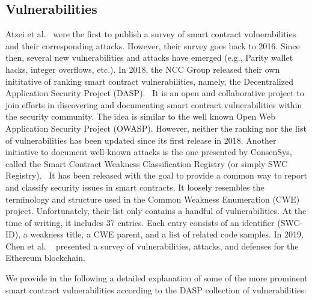     \subsection{Vulnerabilities}
        Atzei et al.~\cite{atzei2017survey} were the first to publish a survey of smart contract vulnerabilities and their corresponding attacks.
        However, their survey goes back to 2016.
        Since then, several new vulnerabilities and attacks have emerged (e.g., Parity wallet hacks, integer overflows, etc.).
        In 2018, the NCC Group released their own inititative of ranking smart contract vulnerabilities, namely, the Decentralized Application Security Project (DASP).~\cite{dasp}
        It is an open and collaborative project to join efforts in discovering and documenting smart contract vulnerabilities within the security community.
        The idea is similar to the well known Open Web Application Security Project (OWASP).
        However, neither the ranking nor the list of vulnerabilities has been updated since its first release in 2018.
        Another initiative to document well-known attacks is the one presented by ConsenSys, called the Smart Contract Weakness Classification Registry (or simply SWC Registry).~\cite{swcregistry}
        It has been released with the goal to provide a common way to report and classify security issues in smart contracts.
        It loosely resembles the terminology and structure used in the Common Weakness Enumeration (CWE) project.
        Unfortunately, their list only contains a handful of vulnerabilities.
        At the time of writing, it includes 37 entries.
        Each entry consists of an identifier (SWC-ID), a weakness title, a CWE parent, and a list of related code samples.
        In 2019, Chen et al. ~\cite{chen2020survey} presented a survey of vulnerabilities, attacks, and defenses for the Ethereum blockchain.

        We provide in the following a detailed explanation of some of the more prominent smart contract vulnerabilities according to the DASP collection of vulnerabilities:

